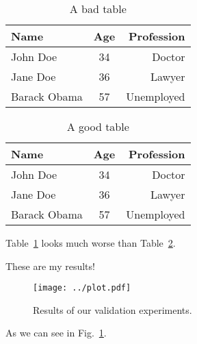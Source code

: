
\begin{table}[h]
\centering %
\begin{tabular}{|l|c|r|}
\hline
Name & Age & Profession\\
\hline
John Doe & 34 & Doctor\\
\hline
Jane Doe & 36 & Lawyer\\
\hline
Barack Obama & 57 & Unemployed\\
\hline
\end{tabular}
\caption{A bad table}
\label{tab:bad}
\end{table}


\begin{table}[h]
\centering
\begin{tabular}{lcr}
\toprule
Name & Age & Profession\\
\midrule
John Doe & 34 & Doctor\\
Jane Doe & 36 & Lawyer\\
Barack Obama & 57 & Unemployed\\
\bottomrule
\end{tabular}
\caption{A good table}
\label{tab:good}
\end{table}

Table~\ref{tab:bad} looks much worse than Table~\ref{tab:good}.


These are my results!

\begin{figure}[h]
\centering
\texttt{[image: ../plot.pdf]}
\caption{Results of our validation experiments.}
\label{fig:plot}
\end{figure}

As we can see in Fig.~\ref{fig:plot}.
